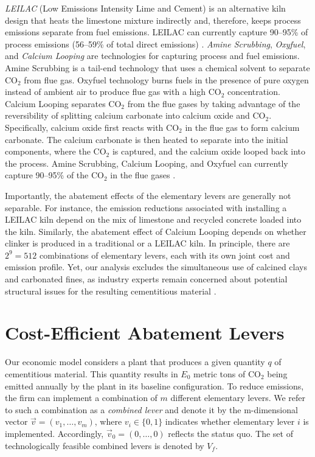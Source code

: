 \documentclass[12pt, a4paper]{article} %
\begin{document}
\emph{LEILAC} (Low Emissions Intensity Lime and Cement) is an alternative kiln design that heats the limestone mixture indirectly and, therefore, keeps process emissions separate from fuel emissions. LEILAC can currently capture 90--95\% of process emissions (56--59\% of total direct emissions) \citep{leilac2020low}. \emph{Amine Scrubbing}, \emph{Oxyfuel}, and \emph{Calcium Looping} are technologies for capturing process and fuel emissions. Amine Scrubbing is a tail-end technology that uses a chemical solvent to separate CO$_2$ from flue gas. Oxyfuel technology burns fuels in the presence of pure oxygen instead of ambient air to produce flue gas with a high CO$_2$ concentration. Calcium Looping separates CO$_2$ from the flue gases by taking advantage of the reversibility of splitting calcium carbonate into calcium oxide and CO$_2$. Specifically, calcium oxide first reacts with CO$_2$ in the flue gas to form calcium carbonate. The calcium carbonate is then heated to separate into the initial components, where the CO$_2$ is captured, and the calcium oxide looped back into the process. Amine Scrubbing, Calcium Looping, and Oxyfuel can currently capture 90--95\% of the CO$_2$ in the flue gases \citep{ecra2022state,rochelle2009amine,iea2018technology,gcca2022calcium}.

Importantly, the abatement effects of the elementary levers are generally not separable. For instance, the emission reductions associated with installing a LEILAC kiln depend on the mix of limestone and recycled concrete loaded into the kiln. Similarly, the abatement effect of Calcium Looping depends on whether clinker is produced in a traditional or a LEILAC kiln. In principle, there are $2^9 = 512$ combinations of elementary levers, each with its own joint cost and emission profile. Yet, our analysis excludes the simultaneous use of calcined clays and carbonated fines, as industry experts remain concerned about potential structural issues for the resulting cementitious material \citep{zajac2020effect}.


\section{Cost-Efficient Abatement Levers}
\label{sec: lac}

Our economic model considers a plant that produces a given quantity $q$ of cementitious material. This quantity results in $E_0$ metric tons of CO$_2$ being emitted annually by the plant in its baseline configuration. To reduce emissions, the firm can implement a combination of $m$ different elementary levers. We refer to such a combination as a \emph{combined lever} and denote it by the m-dimensional vector $\vec{v} = (v_1, \ldots, v_m)$, where $v_i \in \{0,1\}$ indicates whether elementary lever $i$ is implemented. Accordingly, $\vec{v}_0 =(0, \ldots, 0)$ reflects the status quo. The set of technologically feasible combined levers is denoted by $V_f$.
\end{document}
